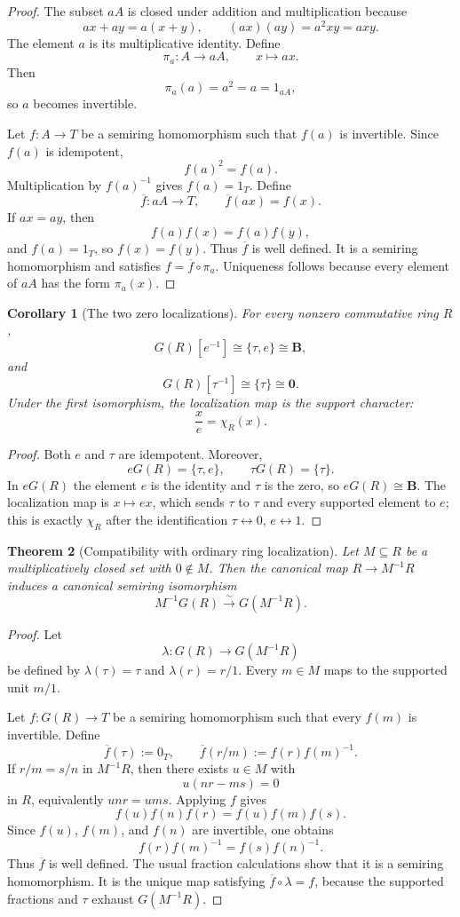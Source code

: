 \documentclass[11pt]{amsart}
\numberwithin{equation}{section}
\newtheorem{theorem}{Theorem}[section]
\newtheorem{corollary}[theorem]{Corollary}
\theoremstyle{definition}
\newcommand{\B}{\mathbf B}
\newcommand{\zero}{\mathbf 0}
\begin{document}
\begin{proof}
The subset $aA$ is closed under addition and multiplication because
\[
ax+ay=a(x+y),
\qquad
(ax)(ay)=a^2xy=axy.
\]
The element $a$ is its multiplicative identity.  Define
\[
\pi_a:A\longrightarrow aA,
\qquad
x\longmapsto ax.
\]
Then
\[
\pi_a(a)=a^2=a=1_{aA},
\]
so $a$ becomes invertible.

Let $f:A\to T$ be a semiring homomorphism such that $f(a)$ is invertible.  Since $f(a)$ is idempotent,
\[
f(a)^2=f(a).
\]
Multiplication by $f(a)^{-1}$ gives $f(a)=1_T$.  Define
\[
\overline f:aA\longrightarrow T,
\qquad
\overline f(ax)=f(x).
\]
If $ax=ay$, then
\[
f(a)f(x)=f(a)f(y),
\]
and $f(a)=1_T$, so $f(x)=f(y)$.  Thus $\overline f$ is well defined.  It is a semiring homomorphism and satisfies $f=\overline f\circ\pi_a$.  Uniqueness follows because every element of $aA$ has the form $\pi_a(x)$.
\end{proof}

\begin{corollary}[The two zero localizations]\label{cor:two-zero-localizations}
For every nonzero commutative ring $R$,
\[
G(R)[e^{-1}]\cong\{\tau,e\}\cong\B,
\]
and
\[
G(R)[\tau^{-1}]\cong\{\tau\}\cong\zero.
\]
Under the first isomorphism, the localization map is the support character:
\[
\frac{x}{e}=\chi_R(x).
\]
\end{corollary}

\begin{proof}
Both $e$ and $\tau$ are idempotent.  Moreover,
\[
eG(R)=\{\tau,e\},
\qquad
\tau G(R)=\{\tau\}.
\]
In $eG(R)$ the element $e$ is the identity and $\tau$ is the zero, so $eG(R)\cong\B$.  The localization map is $x\mapsto ex$, which sends $\tau$ to $\tau$ and every supported element to $e$; this is exactly $\chi_R$ after the identification $\tau\leftrightarrow0$, $e\leftrightarrow1$.
\end{proof}

\begin{theorem}[Compatibility with ordinary ring localization]\label{thm:ring-localization}
Let $M\subseteq R$ be a multiplicatively closed set with $0\notin M$.  Then the canonical map $R\to M^{-1}R$ induces a canonical semiring isomorphism
\[
M^{-1}G(R)\xrightarrow{\sim}G(M^{-1}R).
\]
\end{theorem}

\begin{proof}
Let
\[
\lambda:G(R)\longrightarrow G(M^{-1}R)
\]
be defined by $\lambda(\tau)=\tau$ and $\lambda(r)=r/1$.  Every $m\in M$ maps to the supported unit $m/1$.

Let $f:G(R)\to T$ be a semiring homomorphism such that every $f(m)$ is invertible.  Define
\[
\overline f(\tau):=0_T,
\qquad
\overline f(r/m):=f(r)f(m)^{-1}.
\]
If $r/m=s/n$ in $M^{-1}R$, then there exists $u\in M$ with
\[
u(nr-ms)=0
\]
in $R$, equivalently $unr=ums$.  Applying $f$ gives
\[
f(u)f(n)f(r)=f(u)f(m)f(s).
\]
Since $f(u)$, $f(m)$, and $f(n)$ are invertible, one obtains
\[
f(r)f(m)^{-1}=f(s)f(n)^{-1}.
\]
Thus $\overline f$ is well defined.  The usual fraction calculations show that it is a semiring homomorphism.  It is the unique map satisfying $\overline f\circ\lambda=f$, because the supported fractions and $\tau$ exhaust $G(M^{-1}R)$.
\end{proof}
\end{document}

